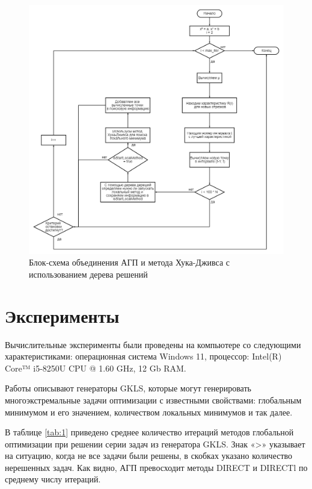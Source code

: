 \documentclass[12pt, a4paper, russian]{article}
\begin{document}
\begin{figure}[ht!]

	\begin{center}
		\begin{minipage}[h]{0.9\linewidth}
			\includegraphics[width=1\linewidth]{figure/fig3.png}
			\caption{Блок-схема объединения АГП и метода Хука-Дживса с использованием дерева решений} %
			\label{fig:fig3}
		\end{minipage}
	\end{center}
\end{figure}	

\section{Эксперименты}

Вычислительные эксперименты были проведены на компьютере со следующими характеристиками: операционная система Windows 11, процессор: Intel(R) Core™ i5-8250U CPU @ 1.60 GHz, 12 Gb RAM.

Работы \cite{fio_bib13, fio_bib17} описывают генераторы GKLS, которые могут генерировать многоэкстремальные задачи оптимизации с известными свойствами: глобальным минимумом и его значением, количеством локальных минимумов и так далее.

В таблице \ref{tab:1} приведено среднее количество итераций методов глобальной оптимизации при решении серии задач из генератора GKLS. Знак «>» указывает на ситуацию, когда не все задачи были решены, в скобках указано количество нерешенных задач. Как видно, АГП превосходит методы DIRECT и DIRECTl по среднему числу итераций. 
\end{document}
